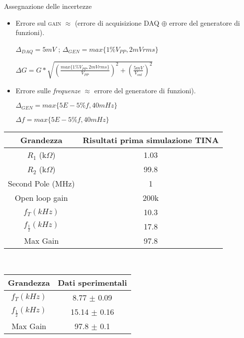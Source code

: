 \documentclass{beamer}
\begin{document}
\begin{frame}{Assegnazione delle incertezze}
\begin{itemize}
\item Errore sul \textsc{gain} $ \approx $ (errore di acquisizione DAQ $ \oplus $ errore del generatore di funzioni).

\begin{definition}
$ \Delta _{DAQ} = 5 mV$ ; $ \Delta _{GEN} = max\{1 \% V_{PP}, 2\si{mV}rms\}$
\end{definition}

\begin{example}
$\Delta G = G * \sqrt{(\frac{max\{1 \% V_{PP}, 2\si{mV}rms\}}{V_{PP}})^2 + (\frac{5\si{mV}}{V_{out}})^2}$
\end{example}


\item Errore sulle \textit{frequenze} $ \approx $ errore del generatore di funzioni).

\begin{definition}
$ \Delta _{GEN} = max\{5E-5 \% f, 40\si{mHz}\}$
\end{definition}

\begin{example}
$\Delta f = max\{5E-5 \% f, 40\si{mHz}\} $
\end{example}

\end{itemize}
\end{frame}

\begin{frame}

{
\centering
\begin{tabular}{|c|c|}
\hline 
Grandezza & Risultati prima simulazione TINA\\ 
\hline 
$R_1$ (k$\Omega$)& 1.03  \\ 
\hline 
$R_2$ (k$\Omega$) & 99.8 \\ 
\hline 
Second Pole (MHz) & 1 \\ 
\hline
Open loop gain & 200k\\
\hline 
 
$f_T (kHz)$ & 10.3 \\ 
\hline 
$f_{\frac{1}{2}} (kHz)$ & 17.8 \\ 
\hline 
Max Gain & 97.8 \\ 
\hline 
\end{tabular}\\
 
 \begin{tabular}{|c|c|}
 \hline 
 Grandezza & Dati sperimentali \\ 
 \hline 
 $f_T (kHz)$ & 8.77 $\pm$ 0.09 \\ 
 \hline 
 $f_{\frac{1}{2}} (kHz)$ & 15.14 $\pm$ 0.16 \\ 
 \hline 
 Max Gain & 97.8 $\pm$ 0.1 \\ 
 \hline 
 \end{tabular}
 
} 
 
\end{frame}
\end{document}
